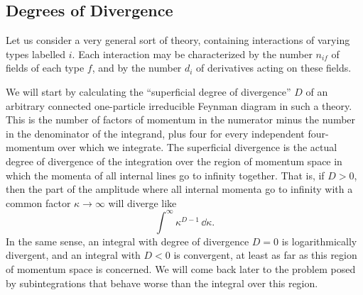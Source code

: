 
\subsection{Degrees of Divergence}

Let us consider a very general sort of theory, containing interactions of
varying types labelled $i$. Each interaction may be characterized by the
number $n_{if}$ of fields of each type $f$, and by the number $d_i$ of
derivatives acting on these fields.

We will start by calculating the ``superficial degree of divergence'' $D$ of
an arbitrary connected one-particle irreducible Feynman diagram in such a
theory. This is the number of factors of momentum in the numerator minus the
number in the denominator of the integrand, plus four for every independent
four-momentum over which we integrate. The superficial divergence is the
actual degree of divergence of the integration over the region of momentum
space in which the momenta of all internal lines go to infinity together.
That is, if $D>0$, then the part of the amplitude where all internal momenta
go to infinity with a common factor $\kappa\to\infty$ will diverge like
\begin{equation}
  \int^\infty \kappa^{D-1}\,\dd\kappa.
  \tag{12.1.1}\label{eq:12.1.1}
\end{equation}
In the same sense, an integral with degree of divergence $D=0$ is
logarithmically divergent, and an integral with $D<0$ is convergent, at least
as far as this region of momentum space is concerned. We will come back later
to the problem posed by subintegrations that behave worse than the integral
over this region.


